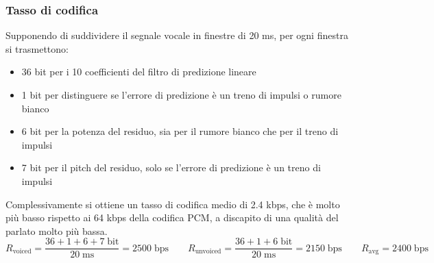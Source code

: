 \subsubsection*{Tasso di codifica}
Supponendo di suddividere il segnale vocale in finestre di 20 ms, per ogni finestra si trasmettono:
\begin{itemize}
	\item 36 bit per i 10 coefficienti del filtro di predizione lineare
	\item 1 bit per distinguere se l'errore di predizione è un treno di impulsi o rumore bianco
	\item 6 bit per la potenza del residuo, sia per il rumore bianco che per il treno di impulsi
	\item 7 bit per il pitch del residuo, solo se l'errore di predizione è un treno di impulsi
\end{itemize}
Complessivamente si ottiene un tasso di codifica medio di 2.4 kbps, che è molto più basso rispetto ai 64 kbps della
codifica PCM, a discapito di una qualità del parlato molto più bassa.
\[R_\text{voiced} = \frac{36 + 1 + 6 + 7 \; \text{bit}}{20 \; \text{ms}} = 2500 \; \text{bps} \qquad R_\text{unvoiced} = \frac{36 + 1 + 6 \; \text{bit}}{20 \; \text{ms}} = 2150 \; \text{bps} \qquad R_\text{avg} = 2400 \; \text{bps}\]

